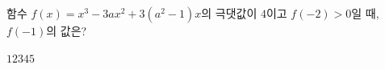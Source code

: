 함수 $f(x)=x^3-3ax^2+3(a^2-1)x$의 극댓값이 $4$이고 $f(-2)>0$일 때, $f(-1)$의 값은? 
\begin{choices32}{$1$}{$2$}{$3$}{$4$}{$5$}\end{choices32}
